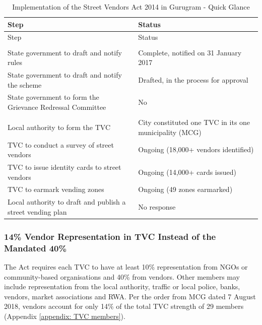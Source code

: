\documentclass[a4paper, 12pt, twoside, table]{article}
\begin{document}
{\begin{longtable}[l]{>{\raggedright}p{7cm}>{\raggedright\arraybackslash}p{7.5cm}}
  \caption{Implementation of the Street Vendors Act 2014 in Gurugram - Quick Glance}\\
    \toprule
    Step & Status\\
    \midrule
    \endfirsthead
    Step & Status\\
    \midrule
    \endhead
    \endfoot
    \endlastfoot
    \multicolumn{2}{p{36.055em}}{Haryana} \\
    \rowcolor{SVACgreen2}State government to draft and notify rules & Complete, notified on 31 January 2017 \\
    \rowcolor{SVACyellow2} State government to draft and notify the scheme & Drafted, in the process for approval \\
    \rowcolor{SVACred2} State government to form the Grievance Redressal Committee & No \\
    \midrule
    \multicolumn{2}{p{36.055em}}{Gurugram}\\
    \midrule
    \rowcolor{SVACgreen2} Local authority to form the TVC & City constituted one TVC in its one municipality (MCG) \\
      \rowcolor{SVACyellow2} TVC to conduct a survey of street vendors & Ongoing (18,000+ vendors identified) \\ %
    \rowcolor{SVACyellow2} TVC to issue identity cards to street vendors & Ongoing (14,000+ cards issued) \\ %
    \rowcolor{SVACyellow2}TVC to earmark vending zones & Ongoing (49 zones earmarked) \\
    \rowcolor{SVACred2} Local authority to draft and publish a street vending plan & No response \\
    \bottomrule
\end{longtable}

\subsubsection*{14\% Vendor Representation in TVC Instead of the Mandated 40\%} 


The Act requires each TVC to have at least 10\% representation from NGOs or community-based organisations and 40\% from vendors. Other members may include representation from the local authority, traffic or local police, banks, vendors, market associations and RWA. Per the order from MCG dated 7 August 2018, vendors account for only 14\% of the total TVC strength of 29 members (Appendix \ref{appendix: TVC members}).

}
\end{document}
